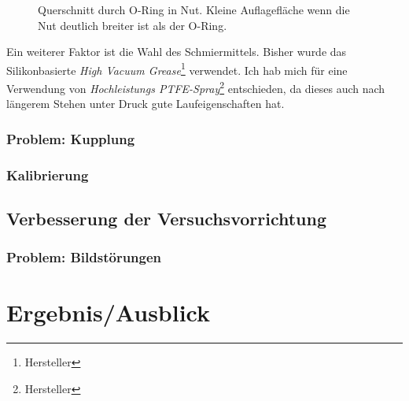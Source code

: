 \documentclass[
    11pt,
    ngerman
]{scrreprt}
\begin{document}
\begin{figure}[htbp]
\begin{minipage}[htbp]{.45\textwidth}
    \centering
    
    \caption{%
        Querschnitt durch O-Ring in Nut. Breite Auflagefläche des O-Rings bei zu schmaler Nut.
    }
    \label{fig:nut_schmal}
\end{minipage}
\hfill
\begin{minipage}[htbp]{.45\textwidth}
    \centering
    
    \caption{%
        Querschnitt durch O-Ring in Nut. Kleine Auflagefläche wenn die Nut deutlich breiter ist als der O-Ring.
    }
    \label{fig:nut_breit}
\end{minipage}
\end{figure}

Ein weiterer Faktor ist die Wahl des Schmiermittels. Bisher wurde das
Silikonbasierte \emph{High Vacuum Grease}\footnote{Hersteller} verwendet. Ich
hab mich für eine Verwendung von \emph{Hochleistungs
\textsc{PTFE}-Spray}\footnote{Hersteller} entschieden, da dieses auch nach
längerem Stehen unter Druck gute Laufeigenschaften hat.


\subsection{Problem: Kupplung}

\subsection{Kalibrierung}

\section{Verbesserung der Versuchsvorrichtung}

\subsection{Problem: Bildstörungen}

\chapter{Ergebnis/Ausblick}
\end{document}

